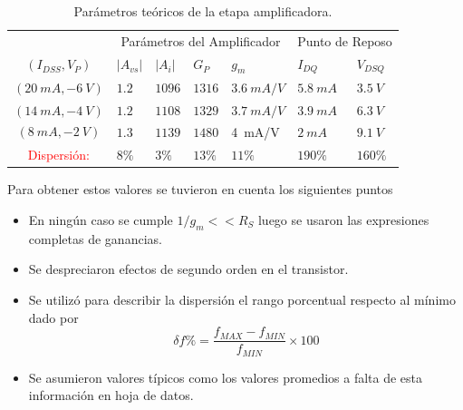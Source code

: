 \begin{multicols}{2}
        \begin{table}[h]
        \centering
        \begin{tabularx}{1\textwidth}{XXXXXXXX}
        \hline
        \multicolumn{2}{c}{}				& \multicolumn{4}{c}{Parámetros del Amplificador}						& \multicolumn{2}{c}{Punto de Reposo} \\
        									\cmidrule(r){3-6}														\cmidrule(r){7-8}
        \multicolumn{2}{c}{$(I_{DSS},V_{P})$}& $|A_{vs}|$  		& $|A_{i}|$ 		& $G_P$ 			& $g_m$ 		& $I_{DQ}$ 			& $V_{DSQ}$			\\
        \cmidrule(r){1-2}  									\cmidrule(r){3-3} \cmidrule(r){4-4} 	\cmidrule(r){5-5} 	\cmidrule(r){6-6} \cmidrule(r){7-7} 	\cmidrule(r){8-8}
        \multicolumn{2}{c}{$(20\ mA,-6\ V)$}& $1.2$	& $1096$	& $1316$ & $3.6\ mA/V$ & $5.8\ mA$& $3.5\ V$\\
        \hline
        \multicolumn{2}{c}{$(14\ mA,-4\ V)$}& $1.2$	& $1108$	& $1329$ & $3.7\ mA/V$& $3.9\ mA$ & $6.3\ V$\\
        \hline
        \multicolumn{2}{c}{$$(8\ mA,-2\ V)$$}&$1.3$	& $1139$	& $1480$ & 4\ mA/V & $2\ mA$ & $9.1\ V$ \\
        \hline
        \hline
        \multicolumn{2}{c}{\textcolor{red}{Dispersión:}} & $8\%$ & $3\%$ & $13\%$ & $11\%$ & $190\%$ & $160\% $\\
        \hline
        \end{tabularx}
        \caption{Parámetros teóricos de la etapa amplificadora.}
        \label{tab:dispersion}
        \end{table}

        Para obtener estos valores se tuvieron en cuenta los siguientes puntos

        \begin{itemize}
        	\item En ningún caso se cumple $1/g_m << R_S$ luego se usaron las expresiones completas de ganancias.
        	\item Se despreciaron efectos de segundo orden en el transistor.
        	\item Se utilizó para describir la dispersión el rango porcentual respecto al mínimo dado por
        		\begin{equation}
        		\delta f \% = \frac{f_{MAX}-f_{MIN}}{f_{MIN}}\times 100 \nonumber
        		\end{equation}
        	\item Se asumieron valores típicos como los valores promedios a falta de esta información en hoja de datos.


\end{itemize}
\end{multicols}
